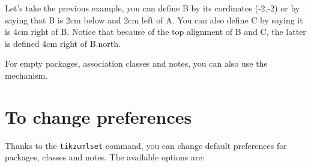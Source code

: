 \documentclass[a4paper,11pt]{report}
\begin{document}
\medskip

Let's take the previous example, you can define B by its cordinates (-2,-2) or by saying that B is 2cm below and 2cm left of A. You can also define C by saying it is 4cm right of B. Notice that because of the top alignment of B and C, the latter is defined 4cm right of B.north.

\medskip

\begin{minipage}{0.5\textwidth}
	
\end{minipage}
\begin{minipage}{0.5\textwidth}
	\begin{center}
	\end{center}
\end{minipage}

\medskip

For empty packages, association classes and notes, you can also use the mechanism.

\section{To change preferences}\label{s.classset}

Thanks to the {\tt tikzumlset} command, you can change default preferences for packages, classes and notes. The available options are:
\end{document}

